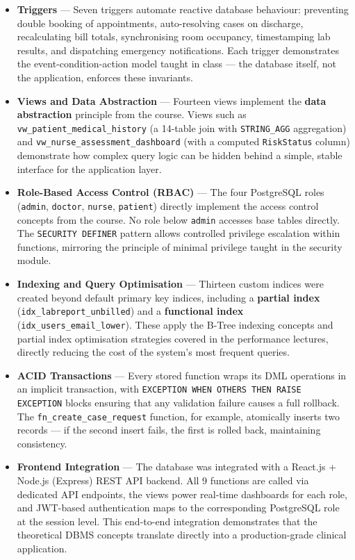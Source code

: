 \documentclass{article}
\begin{document}
\begin{itemize}[leftmargin=1.5cm]
  \item \textbf{Triggers} ---
  Seven triggers automate reactive database behaviour: preventing double booking of appointments, auto-resolving cases on discharge, recalculating bill totals, synchronising room occupancy, timestamping lab results, and dispatching emergency notifications. Each trigger demonstrates the event-condition-action model taught in class --- the database itself, not the application, enforces these invariants.

  \item \textbf{Views and Data Abstraction} ---
  Fourteen views implement the \textbf{data abstraction} principle from the course. Views such as \texttt{vw\_patient\_medical\_history} (a 14-table join with \texttt{STRING\_AGG} aggregation) and \texttt{vw\_nurse\_assessment\_dashboard} (with a computed \texttt{RiskStatus} column) demonstrate how complex query logic can be hidden behind a simple, stable interface for the application layer.

  \item \textbf{Role-Based Access Control (RBAC)} ---
  The four PostgreSQL roles (\texttt{admin}, \texttt{doctor}, \texttt{nurse}, \texttt{patient}) directly implement the access control concepts from the course. No role below \texttt{admin} accesses base tables directly. The \texttt{SECURITY DEFINER} pattern allows controlled privilege escalation within functions, mirroring the principle of minimal privilege taught in the security module.

  \item \textbf{Indexing and Query Optimisation} ---
  Thirteen custom indices were created beyond default primary key indices, including a \textbf{partial index} (\texttt{idx\_labreport\_unbilled}) and a \textbf{functional index} (\texttt{idx\_users\_email\_lower}). These apply the B-Tree indexing concepts and partial index optimisation strategies covered in the performance lectures, directly reducing the cost of the system's most frequent queries.

  \item \textbf{ACID Transactions} ---
  Every stored function wraps its DML operations in an implicit transaction, with \texttt{EXCEPTION WHEN OTHERS THEN RAISE EXCEPTION} blocks ensuring that any validation failure causes a full rollback. The \texttt{fn\_create\_case\_request} function, for example, atomically inserts two records --- if the second insert fails, the first is rolled back, maintaining consistency.

  \item \textbf{Frontend Integration} ---
  The database was integrated with a React.js + Node.js (Express) REST API backend. All 9 functions are called via dedicated API endpoints, the views power real-time dashboards for each role, and JWT-based authentication maps to the corresponding PostgreSQL role at the session level. This end-to-end integration demonstrates that the theoretical DBMS concepts translate directly into a production-grade clinical application.

\end{itemize}
\end{document}
